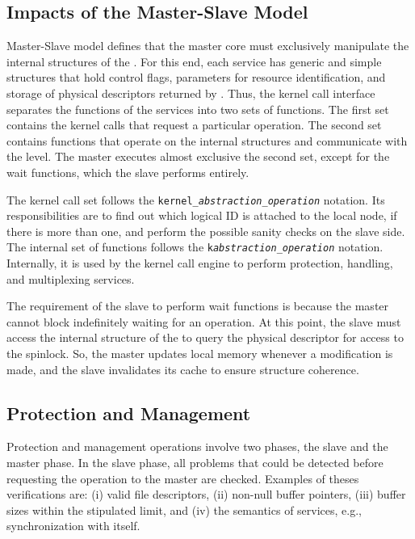 		\subsection{Impacts of the Master-Slave Model}

			Master-Slave model defines that the master core must exclusively manipulate
			the internal structures of the \os. For this end, each service has generic and
			simple structures that hold control flags, parameters for resource
			identification, and storage of physical descriptors returned by \hal. Thus,
			the kernel call interface separates the functions of the services into two
			sets of functions. The first set contains the kernel calls that request a particular
			operation. The second set contains functions that operate on the internal structures
			and communicate with the \hal level. The master executes almost exclusive
			the second set, except for the wait functions, which the slave performs entirely.

			The kernel call set follows the \texttt{kernel\_\textit{abstraction}\_\textit{operation}}
			notation. Its responsibilities are to find out which logical ID is attached to
			the local node, if there is more than one, and perform the possible sanity
			checks on the slave side. The internal set of functions follows the
			\texttt{k\textit{abstraction}\_\textit{operation}} notation. Internally, it
			is used by the kernel call engine to perform protection, handling, and
			multiplexing services. 

			The requirement of the slave to perform wait functions is because the master
			cannot block indefinitely waiting for an operation. At this point, the slave
			must access the internal structure of the \os to query the physical descriptor
			for access to the \hal spinlock. So, the master updates local memory whenever
			a modification is made, and the slave invalidates its cache to ensure structure
			coherence.

		\subsection{Protection and Management}

			Protection and management operations involve two phases, the slave and the master phase.
			In the slave phase, all problems that could be detected before requesting the operation
			to the master are checked.
			Examples of theses verifications are:
			(i) valid file descriptors,
			(ii) non-null buffer pointers,
			(iii) buffer sizes within the stipulated limit, and
			(iv) the semantics of services, e.g., synchronization with itself.


